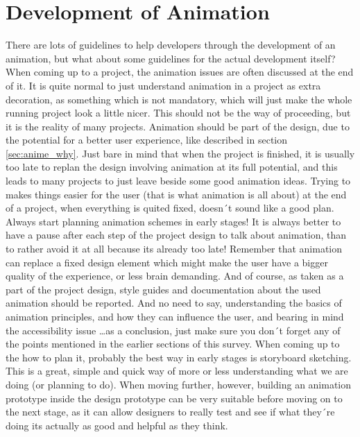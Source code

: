 \section{Development of Animation} %
\label{sec:anime_dev}

There are lots of guidelines to help developers through the development of an 
animation, but what about some guidelines for the actual development itself? 
When coming up to a project, the animation issues are often discussed at the 
end of it. It is quite normal to just understand animation in a project as 
extra decoration, as something which is not mandatory, which will just make the 
whole running project look a little nicer. This should not be the way of 
proceeding, but it is the reality of many projects. Animation should be part of 
the design, due to the potential for a better user experience, like described 
in section \ref{sec:anime_why}. Just bare in mind that when the project is 
finished, it is usually too late to replan the design involving animation at 
its full potential, and this leads to many projects to just leave beside some 
good animation ideas.
Trying to makes things easier for the user (that is what animation is all 
about) at the end of a project, when everything is quited fixed, doesn´t sound 
like a good plan. Always start planning animation schemes in early stages! It 
is always better to have a pause after each step of the project design to talk 
about animation, than to rather avoid it at all because its already too late! 
Remember that animation can replace a fixed design element which might make the 
user have a bigger quality of the experience, or less brain demanding. And of 
course, as taken as a part of the project design, style guides and 
documentation about the used animation should be reported. And no need to say, 
understanding the basics of animation principles, and how they can influence 
the user, and bearing in mind the accessibility issue \ldots as a conclusion, 
just make sure you don´t forget any of the points mentioned in the earlier 
sections of this survey. When coming up to the how to plan it, probably the 
best way in early stages is storyboard sketching. This is a great, simple and 
quick way of more or less understanding what we are doing (or planning to do). 
When moving further, however, building an animation prototype inside the design 
prototype can be very suitable before moving on to the next stage, as it can 
allow designers to really test and see if what they´re doing its actually as 
good and helpful as they think.


